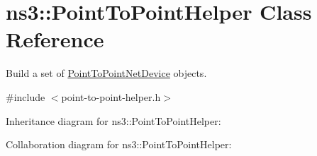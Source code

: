 \hypertarget{classns3_1_1PointToPointHelper}{}\section{ns3\+:\+:Point\+To\+Point\+Helper Class Reference}
\label{classns3_1_1PointToPointHelper}


Build a set of \hyperlink{classns3_1_1PointToPointNetDevice}{Point\+To\+Point\+Net\+Device} objects.  




{\ttfamily \#include $<$point-\/to-\/point-\/helper.\+h$>$}



Inheritance diagram for ns3\+:\+:Point\+To\+Point\+Helper\+:


Collaboration diagram for ns3\+:\+:Point\+To\+Point\+Helper\+:
